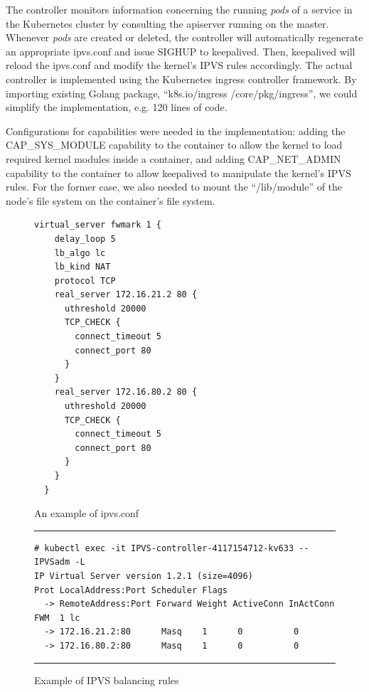 The controller monitors information concerning the running {\em pods} of a service 
in the Kubernetes cluster by consulting the apiserver running on the master.
Whenever {\em pods} are created or deleted, the controller will automatically regenerate an appropriate ipvs.conf 
and issue SIGHUP to keepalived.
Then, keepalived will reload the ipvs.conf and modify the kernel's IPVS rules accordingly.
The actual controller\cite{ktaka_ccmp_2017_826894} is implemented using the Kubernetes ingress controller\cite{K8sIngress2017} framework. 
By importing existing Golang package, \enquote{k8s.io/ingress /core/pkg/ingress}, we could simplify the implementation, e.g. 
120 lines of code.  

Configurations for capabilities were needed in the implementation: adding the CAP\_SYS\_MODULE capability 
to the container to allow the kernel to load required kernel modules inside a container, 
and adding CAP\_NET\_ADMIN capability to the container to allow keepalived to manipulate the kernel's IPVS rules. 
For the former case, we also needed to mount the \enquote{/lib/module} of the node's file system on the container's file system.

\begin{figure}
  \centering
\begin{minipage}{0.7\columnwidth}
\begin{lstlisting}[frame=single]
  virtual_server fwmark 1 {
    delay_loop 5
    lb_algo lc
    lb_kind NAT
    protocol TCP
    real_server 172.16.21.2 80 {
      uthreshold 20000
      TCP_CHECK {
        connect_timeout 5
        connect_port 80
      }
    }
    real_server 172.16.80.2 80 {
      uthreshold 20000
      TCP_CHECK {
        connect_timeout 5
        connect_port 80
      }
    }
  }
\end{lstlisting}
\end{minipage}
\caption{An example of ipvs.conf}
\label{fig:ipvs.conf}
\end{figure}

\begin{figure}
  \centering
\rule{\columnwidth}{0.4pt}
\begin{verbatim}
# kubectl exec -it IPVS-controller-4117154712-kv633 -- IPVSadm -L
IP Virtual Server version 1.2.1 (size=4096)
Prot LocalAddress:Port Scheduler Flags
  -> RemoteAddress:Port Forward Weight ActiveConn InActConn
FWM  1 lc
  -> 172.16.21.2:80      Masq    1      0          0         
  -> 172.16.80.2:80      Masq    1      0          0
\end{verbatim}
\rule{\columnwidth}{0.4pt}
\caption{Example of IPVS balancing rules}
\label{fig:IPVS rule}
\end{figure}


